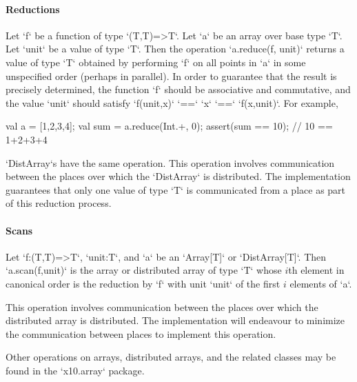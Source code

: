 \paragraph{Reductions}\label{ArrayReductions}

Let \xcd`f` be a function of type \xcd`(T,T)=>T`.  Let
\xcd`a` be an array over base type \xcd`T`.
Let \xcd`unit` be a value of type \xcd`T`.
Then the
operation \xcd`a.reduce(f, unit)` returns a value of type \xcd`T` obtained
by performing \xcd`f` on all points in \xcd`a` in some unspecified order
(perhaps in parallel).  In order to guarantee that the result is precisely
determined, the  function \xcd`f` should be associative and
commutative, and the value \xcd`unit` should satisfy
\xcd`f(unit,x)` \xcd`==` \xcd`x` \xcd`==` \xcd`f(x,unit)`.
For example, 
\begin{xten}
val a = [1,2,3,4];
val sum = a.reduce(Int.+, 0); 
assert(sum == 10); // 10 == 1+2+3+4
\end{xten}



\xcd`DistArray`s have the same operation.
This operation involves communication between the places over which
the \xcd`DistArray` is distributed. The \Xten{} implementation guarantees that
only one value of type \xcd`T` is communicated from a place as part of
this reduction process.

\paragraph{Scans}\label{ArrayScans}


Let \xcd`f:(T,T)=>T`, \xcd`unit:T`, and \xcd`a` be an \xcd`Array[T]` or
\xcd`DistArray[T]`.  Then \xcd`a.scan(f,unit)` is the array or distributed
array of type \xcd`T` whose {$i$}th element in canonical order is the
reduction by \xcd`f` with unit \xcd`unit` of the first {$i$} elements of
\xcd`a`. 


This operation involves communication between the places over which the
distributed array is distributed. The \Xten{} implementation will endeavour to
minimize the communication between places to implement this operation.

Other operations on arrays, distributed arrays, and the related classes may be
found in the \xcd`x10.array` package.
